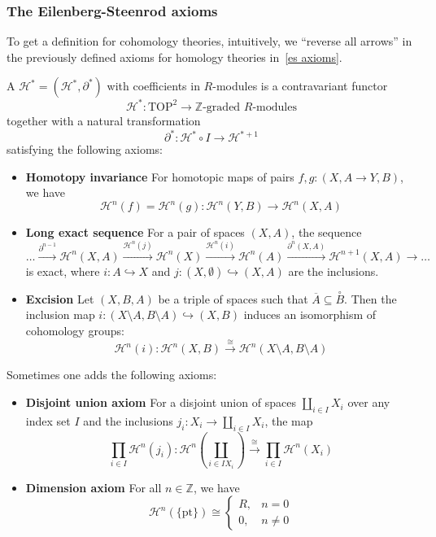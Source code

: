 \documentclass[a4paper,11pt]{article}
\begin{document}
\subsubsection{The Eilenberg-Steenrod axioms}
To get a definition for cohomology theories, intuitively, we \enquote{reverse all arrows} in the previously defined axioms for homology theories in\ \ref{es axioms}.

\begin{definition}
    A  \(\mathcal{H}^\ast=(\mathcal{H}^\ast,\partial^\ast)\) with coefficients in \(R\)-modules is a contravariant functor \[\mathcal{H}^\ast:\mathrm{TOP}^2\to\mathbb{Z}\text{-graded }R\text{-modules}\] together with a natural transformation \[\partial^\ast:\mathcal{H}^\ast\circ I\to\mathcal{H}^{\ast+1}\] satisfying the following axioms:
    \begin{itemize}
        \item \textbf{Homotopy invariance} For homotopic maps of pairs \(f,g:(X,A\to Y,B)\), we have \[\mathcal{H}^n(f)=\mathcal{H}^n(g):\mathcal{H}^n(Y,B)\to\mathcal{H}^n(X,A)\]
        \item \textbf{Long exact sequence} For a pair of spaces \((X,A)\), the sequence \[\dots\xrightarrow{\partial^{n-1}}\mathcal{H}^n(X,A)\xrightarrow{\mathcal{H}^n(j)}\mathcal{H}^n(X)\xrightarrow{\mathcal{H}^n(i)}\mathcal{H}^n(A)\xrightarrow{\partial^n(X,A)}\mathcal{H}^{n+1}(X,A)\rightarrow\dots\] is exact, where \(i:A\hookrightarrow X\) and \(j:(X,\emptyset)\hookrightarrow (X,A)\) are the inclusions.
        \item \textbf{Excision} Let \((X,B,A)\) be a triple of spaces such that \(\overline{A}\subseteq\overset{\circ}{B}\). Then the inclusion map \(i:(X\setminus A,B\setminus A)\hookrightarrow(X,B)\) induces an isomorphism of cohomology groups: \[\mathcal{H}^n(i):\mathcal{H}^n(X,B)\xrightarrow{\cong}\mathcal{H}^n(X\setminus A, B\setminus A)\]
    \end{itemize}
    Sometimes one adds the following axioms:
    \begin{itemize}
        \item \textbf{Disjoint union axiom}
        For a disjoint union of spaces \(\coprod_{i\in I}X_i\) over any index set \(I\) and the inclusions \(j_i:X_i\to\coprod_{i\in I}X_i\), the map
        \[\prod_{i\in I}\mathcal{H}^n(j_i):\mathcal{H}^n\left(\coprod_{i\in I X_i}\right)\xrightarrow{\cong}\prod_{i\in I}\mathcal{H}^n(X_i)\]
        \item \textbf{Dimension axiom}
        For all \(n\in\mathbb{Z}\), we have \[\mathcal{H}^n(\{\mathrm{pt}\})\cong\begin{cases} R, & n=0\\ 0, & n\neq0\end{cases}\]
    \end{itemize}
\end{definition}
\end{document}
